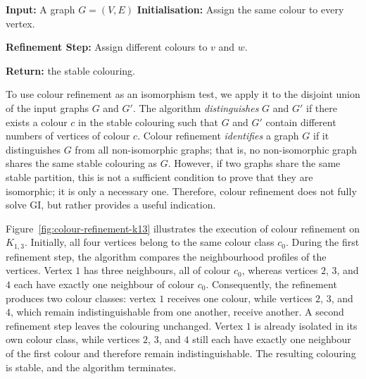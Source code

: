 \begin{algorithm}
    \caption{Colour Refinement Algorithm~\cite{grohe2012structural}}\label{alg:colour-refinement}
    \begin{algorithmic}[1]
    
    \State\textbf{Input:} A graph $G=(V,E)$
    \State\textbf{Initialisation:} Assign the same colour to every vertex.

    \Repeat{}
        \State\textbf{Refinement Step:}
                \State{} Assign different colours to $v$ and $w$.
            \EndIf{}
        \EndFor{}

    \State\textbf{Return:} the stable colouring.

    \end{algorithmic}
\end{algorithm}

To use colour refinement as an isomorphism test, we apply it to the disjoint union of the input graphs $G$ and $G'$. The algorithm \emph{distinguishes} $G$ and $G'$ if there exists a colour $c$ in the stable colouring such that $G$ and $G'$ contain different numbers of vertices of colour $c$. Colour refinement \emph{identifies} a graph $G$ if it distinguishes $G$ from all non-isomorphic graphs; that is, no non-isomorphic graph shares the same stable colouring as $G$. However, if two graphs share the same stable partition, this is not a sufficient condition to prove that they are isomorphic; it is only a necessary one. Therefore, colour refinement does not fully solve GI, but rather provides a useful indication.



Figure~\ref{fig:colour-refinement-k13} illustrates the execution of colour refinement on $K_{1,3}$. Initially, all four vertices belong to the same colour class $c_0$. During the first refinement step, the algorithm compares the neighbourhood profiles of the vertices. Vertex $1$ has three neighbours, all of colour $c_0$, whereas vertices $2$, $3$, and $4$ each have exactly one neighbour of colour $c_0$. Consequently, the refinement produces two colour classes: vertex $1$ receives one colour, while vertices $2$, $3$, and $4$, which remain indistinguishable from one another, receive another. A second refinement step leaves the colouring unchanged. Vertex $1$ is already isolated in its own colour class, while vertices $2$, $3$, and $4$ still each have exactly one neighbour of the first colour and therefore remain indistinguishable. The resulting colouring is stable, and the algorithm terminates.

